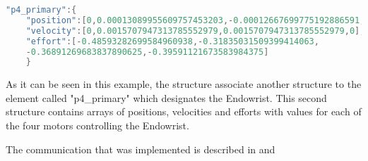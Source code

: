 \begin{lstlisting}[language=C]
"p4_primary":{
	"position":[0,0.00013089955609757453203,-0.00012667699775192886591,0],
	"velocity":[0,0.0015707947313785552979,0.0015707947313785552979,0],
	"effort":[-0.48593282699584960938,-0.31835031509399414063,
	-0.36891269683837890625,-0.39591121673583984375]
	}
\end{lstlisting}

As it can be seen in this example, the structure associate another structure to the element called "p4\_primary" which designates the Endowrist. This second structure contains arrays of positions, velocities and efforts with values for each of the four motors controlling the Endowrist.

The communication that was implemented is described in  and 